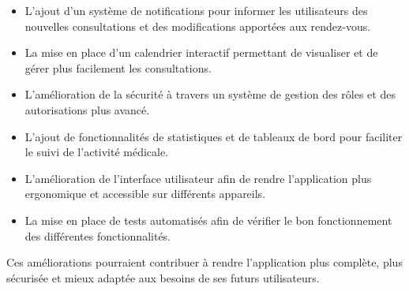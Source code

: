 \begin{itemize}
	\item L'ajout d'un système de notifications pour informer les utilisateurs des nouvelles consultations et des modifications apportées aux rendez-vous.
	
	\item La mise en place d'un calendrier interactif permettant de visualiser et de gérer plus facilement les consultations.
	
	\item L'amélioration de la sécurité à travers un système de gestion des rôles et des autorisations plus avancé.
	
	\item L'ajout de fonctionnalités de statistiques et de tableaux de bord pour faciliter le suivi de l'activité médicale.
	
	\item L'amélioration de l'interface utilisateur afin de rendre l'application plus ergonomique et accessible sur différents appareils.
	
	\item La mise en place de tests automatisés afin de vérifier le bon fonctionnement des différentes fonctionnalités.
\end{itemize}

Ces améliorations pourraient contribuer à rendre l'application plus complète, plus sécurisée et mieux adaptée aux besoins de ses futurs utilisateurs.